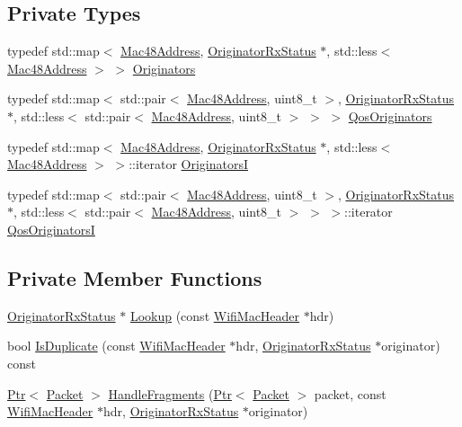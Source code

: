\subsection*{Private Types}
\begin{DoxyCompactItemize}
\item 
typedef std\+::map$<$ \hyperlink{classns3_1_1Mac48Address}{Mac48\+Address}, \hyperlink{classns3_1_1OriginatorRxStatus}{Originator\+Rx\+Status} $\ast$, std\+::less$<$ \hyperlink{classns3_1_1Mac48Address}{Mac48\+Address} $>$ $>$ \hyperlink{classns3_1_1MacRxMiddle_a6263189b2a22e164f77f0a9d58d035cc}{Originators}
\item 
typedef std\+::map$<$ std\+::pair$<$ \hyperlink{classns3_1_1Mac48Address}{Mac48\+Address}, uint8\+\_\+t $>$, \hyperlink{classns3_1_1OriginatorRxStatus}{Originator\+Rx\+Status} $\ast$, std\+::less$<$ std\+::pair$<$ \hyperlink{classns3_1_1Mac48Address}{Mac48\+Address}, uint8\+\_\+t $>$ $>$ $>$ \hyperlink{classns3_1_1MacRxMiddle_a77bf81590cbfd7edc9557dbf4621150b}{Qos\+Originators}
\item 
typedef std\+::map$<$ \hyperlink{classns3_1_1Mac48Address}{Mac48\+Address}, \hyperlink{classns3_1_1OriginatorRxStatus}{Originator\+Rx\+Status} $\ast$, std\+::less$<$ \hyperlink{classns3_1_1Mac48Address}{Mac48\+Address} $>$ $>$\+::iterator \hyperlink{classns3_1_1MacRxMiddle_a51c8afc428c943f9992af8eeabd981d7}{OriginatorsI}
\item 
typedef std\+::map$<$ std\+::pair$<$ \hyperlink{classns3_1_1Mac48Address}{Mac48\+Address}, uint8\+\_\+t $>$, \hyperlink{classns3_1_1OriginatorRxStatus}{Originator\+Rx\+Status} $\ast$, std\+::less$<$ std\+::pair$<$ \hyperlink{classns3_1_1Mac48Address}{Mac48\+Address}, uint8\+\_\+t $>$ $>$ $>$\+::iterator \hyperlink{classns3_1_1MacRxMiddle_a745fb5bcb19538de87c29e223d1d6abc}{Qos\+OriginatorsI}
\end{DoxyCompactItemize}
\subsection*{Private Member Functions}
\begin{DoxyCompactItemize}
\item 
\hyperlink{classns3_1_1OriginatorRxStatus}{Originator\+Rx\+Status} $\ast$ \hyperlink{classns3_1_1MacRxMiddle_ac7ff36607c9fa9f207d70bd1c7f14bc7}{Lookup} (const \hyperlink{classns3_1_1WifiMacHeader}{Wifi\+Mac\+Header} $\ast$hdr)
\item 
bool \hyperlink{classns3_1_1MacRxMiddle_adef5584d8c8059e842a4bce9c4321b88}{Is\+Duplicate} (const \hyperlink{classns3_1_1WifiMacHeader}{Wifi\+Mac\+Header} $\ast$hdr, \hyperlink{classns3_1_1OriginatorRxStatus}{Originator\+Rx\+Status} $\ast$originator) const 
\item 
\hyperlink{classns3_1_1Ptr}{Ptr}$<$ \hyperlink{classns3_1_1Packet}{Packet} $>$ \hyperlink{classns3_1_1MacRxMiddle_ae595f60963be22a3e28975572f3e0707}{Handle\+Fragments} (\hyperlink{classns3_1_1Ptr}{Ptr}$<$ \hyperlink{classns3_1_1Packet}{Packet} $>$ packet, const \hyperlink{classns3_1_1WifiMacHeader}{Wifi\+Mac\+Header} $\ast$hdr, \hyperlink{classns3_1_1OriginatorRxStatus}{Originator\+Rx\+Status} $\ast$originator)
\end{DoxyCompactItemize}

